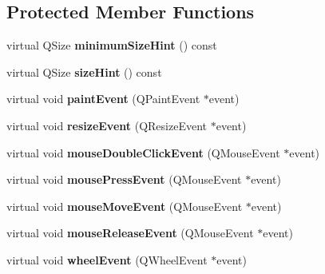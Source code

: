 \subsection*{Protected Member Functions}
\begin{DoxyCompactItemize}
\item 
\hypertarget{class_q_custom_plot_a0f7d90553493be687da80544f7244ad2}{}\label{class_q_custom_plot_a0f7d90553493be687da80544f7244ad2} 
virtual Q\+Size {\bfseries minimum\+Size\+Hint} () const
\item 
\hypertarget{class_q_custom_plot_a51601831bc7d5403d5e729347a10ba33}{}\label{class_q_custom_plot_a51601831bc7d5403d5e729347a10ba33} 
virtual Q\+Size {\bfseries size\+Hint} () const
\item 
\hypertarget{class_q_custom_plot_a2bbc3b1c24bfcc8a7cc1f3008cdd9b73}{}\label{class_q_custom_plot_a2bbc3b1c24bfcc8a7cc1f3008cdd9b73} 
virtual void {\bfseries paint\+Event} (Q\+Paint\+Event $\ast$event)
\item 
\hypertarget{class_q_custom_plot_a13e05523a40c3f08875df5cde85cf0d9}{}\label{class_q_custom_plot_a13e05523a40c3f08875df5cde85cf0d9} 
virtual void {\bfseries resize\+Event} (Q\+Resize\+Event $\ast$event)
\item 
\hypertarget{class_q_custom_plot_a77591913a5b543bdc465dd5e08325a49}{}\label{class_q_custom_plot_a77591913a5b543bdc465dd5e08325a49} 
virtual void {\bfseries mouse\+Double\+Click\+Event} (Q\+Mouse\+Event $\ast$event)
\item 
\hypertarget{class_q_custom_plot_abce84fa2c71e47b9295d67e8fce84bb4}{}\label{class_q_custom_plot_abce84fa2c71e47b9295d67e8fce84bb4} 
virtual void {\bfseries mouse\+Press\+Event} (Q\+Mouse\+Event $\ast$event)
\item 
\hypertarget{class_q_custom_plot_ac64727a4f442770f6e5e6be2d0530843}{}\label{class_q_custom_plot_ac64727a4f442770f6e5e6be2d0530843} 
virtual void {\bfseries mouse\+Move\+Event} (Q\+Mouse\+Event $\ast$event)
\item 
\hypertarget{class_q_custom_plot_a724e97d2e8c03e68adac5f4b6164a1b3}{}\label{class_q_custom_plot_a724e97d2e8c03e68adac5f4b6164a1b3} 
virtual void {\bfseries mouse\+Release\+Event} (Q\+Mouse\+Event $\ast$event)
\item 
\hypertarget{class_q_custom_plot_a7b8bd7e8d3a1d23a8595e9c6a6b76ef1}{}\label{class_q_custom_plot_a7b8bd7e8d3a1d23a8595e9c6a6b76ef1} 
virtual void {\bfseries wheel\+Event} (Q\+Wheel\+Event $\ast$event)
\item 
\hypertarget{class_q_custom_plot_ad7a7d878bf050f101a43008e7d8fdb52}{}\label{class_q_custom_plot_ad7a7d878bf050f101a43008e7d8fdb52} 

\end{DoxyCompactItemize}
